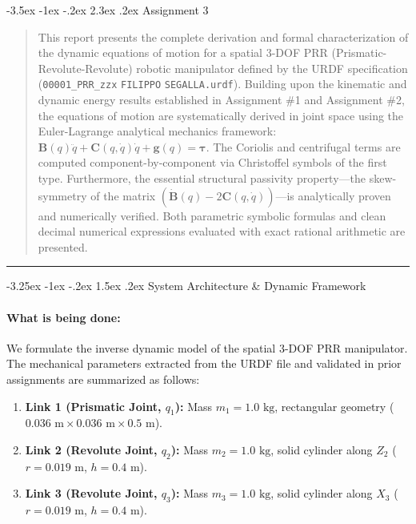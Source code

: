 \documentclass[11pt, a4paper]{article}
\makeatletter
\renewcommand{\section}{\@startsection{section}{1}{\z@}%
    {-3.5ex \@plus -1ex \@minus -.2ex}%
    {2.3ex \@plus .2ex}%
    {\normalfont\Large\bfseries\color{brandblue}}}
\renewcommand{\subsection}{\@startsection{subsection}{2}{\z@}%
    {-3.25ex \@plus -1ex \@minus -.2ex}%
    {1.5ex \@plus .2ex}%
    {\normalfont\large\bfseries\color{brandaccent}}}
\makeatother
\begin{document}
\newpage

\section{Assignment 3}
\label{sec:assignment3}

\begin{abstract}
\noindent
This report presents the complete derivation and formal characterization of the dynamic equations of motion for a spatial 3-DOF PRR (Prismatic-Revolute-Revolute) robotic manipulator defined by the URDF specification (\texttt{00001\_PRR\_zzx} \texttt{FILIPPO} \texttt{SEGALLA.urdf}). Building upon the kinematic and dynamic energy results established in Assignment \#1 and Assignment \#2, the equations of motion are systematically derived in joint space using the Euler-Lagrange analytical mechanics framework: $\mathbf{B}(q)\ddot{q} + \mathbf{C}(q, \dot{q})\dot{q} + \mathbf{g}(q) = \boldsymbol{\tau}$. The Coriolis and centrifugal terms are computed component-by-component via Christoffel symbols of the first type. Furthermore, the essential structural passivity property—the skew-symmetry of the matrix $(\mathbf{\dot{B}}(q) - 2\mathbf{C}(q, \dot{q}))$—is analytically proven and numerically verified. Both parametric symbolic formulas and clean decimal numerical expressions evaluated with exact rational arithmetic are presented.
\end{abstract}

\hrule
\vspace{1.5em}

\subsection{System Architecture \& Dynamic Framework}
\paragraph{What is being done:}
We formulate the inverse dynamic model of the spatial 3-DOF PRR manipulator. The mechanical parameters extracted from the URDF file and validated in prior assignments are summarized as follows:
\begin{enumerate}[leftmargin=1.5em]
    \item \textbf{Link 1 (Prismatic Joint, $q_1$):} Mass $m_1 = 1.0\text{ kg}$, rectangular geometry ($0.036\text{ m} \times 0.036\text{ m} \times 0.5\text{ m}$).
    \item \textbf{Link 2 (Revolute Joint, $q_2$):} Mass $m_2 = 1.0\text{ kg}$, solid cylinder along $Z_2$ ($r = 0.019\text{ m}$, $h = 0.4\text{ m}$).
    \item \textbf{Link 3 (Revolute Joint, $q_3$):} Mass $m_3 = 1.0\text{ kg}$, solid cylinder along $X_3$ ($r = 0.019\text{ m}$, $h = 0.4\text{ m}$).
\end{enumerate}
\end{document}
